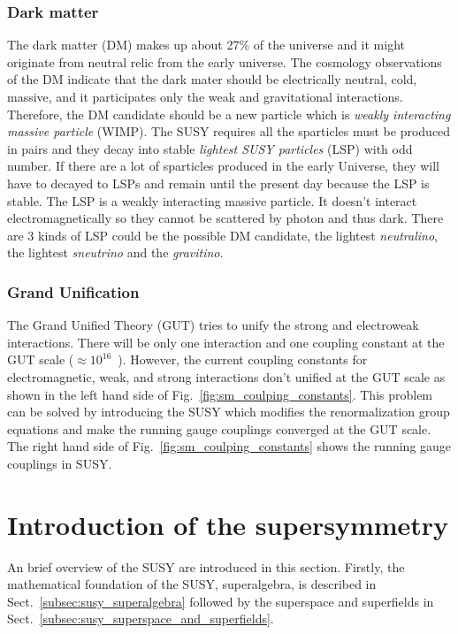 
\subsubsection{Dark matter}
\label{subsubsec:susy_dark_matter}
The dark matter (DM) makes up about 27\% of the universe and it might originate from neutral relic from the early universe.
The cosmology observations of the DM indicate that the dark mater should be electrically neutral, cold, massive, and it participates only the weak and gravitational interactions.
Therefore, the DM candidate should be a new particle which is \textit{weakly interacting massive particle} (WIMP).
The SUSY requires all the sparticles must be produced in pairs and they decay into stable \textit{lightest SUSY particles} (LSP) with odd number.
If there are a lot of sparticles produced in the early Universe, they will have to decayed to LSPs and remain until the present day because the LSP is stable.
The LSP is a weakly interacting massive particle.
It doesn't interact electromagnetically so they cannot be scattered by photon and thus dark.
There are 3 kinds of LSP could be the possible DM candidate, the lightest \textit{neutralino}, the lightest \textit{sneutrino} and the \textit{gravitino}.


\subsubsection{Grand Unification}
\label{subsubsec:susy_gut}
The Grand Unified Theory (GUT) tries to unify the strong and electroweak interactions.
There will be only one interaction and one coupling constant at the GUT scale ($\approx 10^{16}$~{\GeV}).
However, the current coupling constants for electromagnetic, weak, and strong interactions don't unified at the GUT scale as shown in the left hand side of Fig.~\ref{fig:sm_coulping_constants}.
This problem can be solved by introducing the SUSY which modifies the renormalization group equations and make the running gauge couplings converged at the GUT scale.
The right hand side of Fig.~\ref{fig:sm_coulping_constants} shows the running gauge couplings in SUSY.


\section{Introduction of the supersymmetry}
\label{sec:susy_intro}
An brief overview of the SUSY are introduced in this section.
Firstly, the mathematical foundation of the SUSY, superalgebra, is described in Sect.~\ref{subsec:susy_superalgebra} followed by the superspace and superfields in Sect.~\ref{subsec:susy_superspace_and_superfields}.

